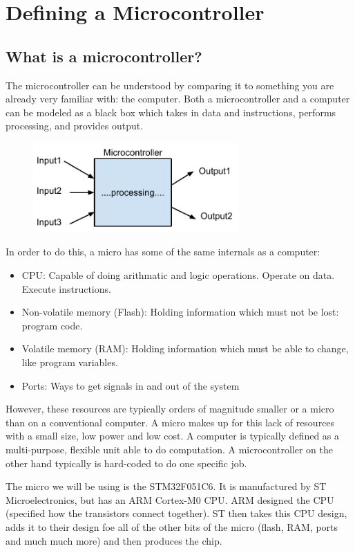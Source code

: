 \section{Defining a Microcontroller}

\subsection{What is a microcontroller?}
The microcontroller can be understood by comparing it to something you are already very familiar with: the computer. Both a microcontroller and a computer can be modeled as a black box which takes in data and instructions, performs processing, and provides output.
\begin{figure}
  \centering
\includegraphics[width=0.7\textwidth]{./week1/processing}
\end{figure}
In order to do this, a micro has some of the same internals as a computer:
\begin{itemize}
  \item CPU: Capable of doing arithmatic and logic operations. Operate on data. Execute instructions. 
  \item Non-volatile memory (Flash): Holding information which must not be lost: program code.
  \item Volatile memory (RAM): Holding information which must be able to change, like program variables.
  \item Ports: Ways to get signals in and out of the system
\end{itemize}
However, these resources are typically orders of magnitude smaller or a micro than on a conventional computer. A micro makes up for this lack of resources with a small size, low power and low cost. 
A computer is typically defined as a multi-purpose, flexible unit able to do computation. A microcontroller on the other hand typically is hard-coded to do one specific job.

The micro we will be using is the STM32F051C6. It is manufactured by ST Microelectronics, but has an ARM Cortex-M0 CPU. ARM designed the CPU (specified how the transistors connect together). ST then takes this CPU design, adds it to their design foe all of the other bits of the micro (flash, RAM, ports and much much more) and then produces the chip.

